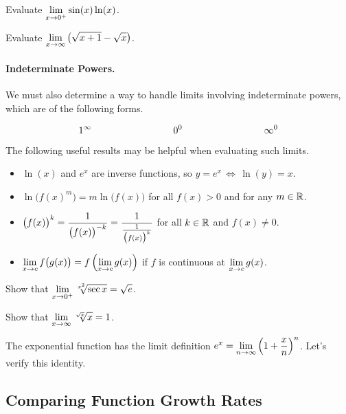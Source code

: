 \documentclass[12pt]{article}
\begin{document}
\Example Evaluate $\displaystyle\lim_{x\to 0^+}\sin(x)\ln(x)$.

\vspace{65mm}

\Example Evaluate $\displaystyle\lim_{x\to\infty}\left(\sqrt{x+1}-\sqrt{x}\right)$.

\newpage

\paragraph{Indeterminate Powers.} We must also determine a way to handle limits involving indeterminate powers, which are of the following forms.

$$1^\infty \hspace{30mm} 0^0 \hspace{30mm} \infty^0$$

The following useful results may be helpful when evaluating such limits.
\begin{itemize}
\item $\ln(x)$ and $e^x$ are inverse functions, so $y=e^x\,\Longleftrightarrow\,\ln(y)=x$.
\vspace{5mm}
\item $\ln\big( f(x)^m\big)=m\ln \big( f(x)\big)$ for all $f(x)>0$ and for any $m\in\mathbb{R}$.
\vspace{4mm}
\item $\big(f(x)\big)^k=\displaystyle\frac{1}{\big(f(x)\big)^{-k}}=\frac{1}{\frac{1}{\big(f(x)\big)^k}}$ for all $k\in \mathbb{R}$ and $f(x)\neq0$.
\item $\displaystyle\lim_{x\to c}f\big( g(x)\big)=f\left(\lim_{x\to c}g(x)\right)$ if $f$ is continuous at $\displaystyle\lim_{x\to c}g(x)$.
\end{itemize}

\vspace{5mm}

\Example Show that $\displaystyle\lim_{x\to 0^+}\sqrt[x^2]{\sec x}=\sqrt{e}$.

\newpage

\Example Show that $\displaystyle\lim_{x\to\infty}\sqrt[\sqrt{x}]{x}=1$.

\vspace{100mm}

\Example The exponential function has the limit definition $e^x=\displaystyle\lim_{n\to\infty}\left( 1+\frac{x}{n}\right)^n$. Let's verify this identity.

\newpage

\subsection*{Comparing Function Growth Rates}
\end{document}

